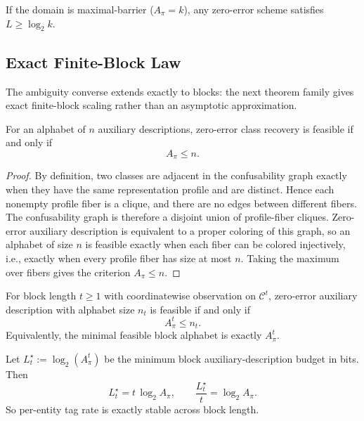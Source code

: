 \begin{corollary}\label{cor:max-barrier-converse}
If the domain is maximal-barrier ($A_\pi = k$), any zero-error scheme satisfies $L \ge \log_2 k$.
\end{corollary}

\subsection{Exact Finite-Block Law}

The ambiguity converse extends exactly to blocks: the next theorem family gives exact finite-block scaling rather than an asymptotic approximation.

\begin{theorem}\label{thm:graph-one-shot-threshold}
For an alphabet of $n$ auxiliary descriptions, zero-error class recovery is feasible if and only if
\[
A_\pi \le n.
\]
\end{theorem}

\begin{proof}
By definition, two classes are adjacent in the confusability graph exactly when they have the same representation profile and are distinct. Hence each nonempty profile fiber is a clique, and there are no edges between different fibers. The confusability graph is therefore a disjoint union of profile-fiber cliques. Zero-error auxiliary description is equivalent to a proper coloring of this graph, so an alphabet of size $n$ is feasible exactly when each fiber can be colored injectively, i.e., exactly when every profile fiber has size at most $n$. Taking the maximum over fibers gives the criterion $A_\pi \le n$.
\end{proof}

\begin{theorem}\label{thm:graph-block-threshold}
For block length $t\ge 1$ with coordinatewise observation on $\mathcal{C}^t$, zero-error auxiliary description with alphabet size $n_t$ is feasible if and only if
\[
A_\pi^t \le n_t.
\]
Equivalently, the minimal feasible block alphabet is exactly $A_\pi^t$.
\end{theorem}

\begin{corollary}\label{cor:graph-logbit-scaling}
Let $L_t^\star := \log_2(A_\pi^t)$ be the minimum block auxiliary-description budget in bits. Then
\[
L_t^\star = t\,\log_2 A_\pi,
\qquad
\frac{L_t^\star}{t} = \log_2 A_\pi.
\]
So per-entity tag rate is exactly stable across block length.
\end{corollary}

